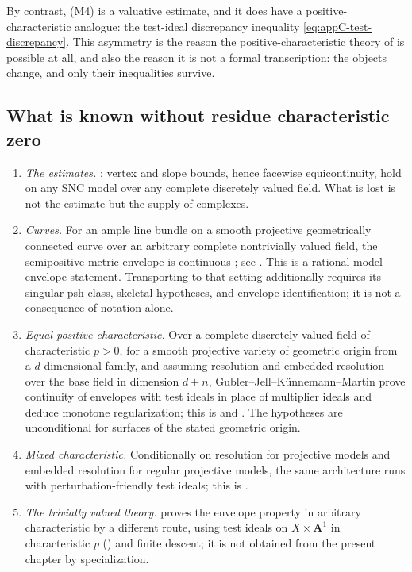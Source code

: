 By contrast, (M4) is a valuative estimate, and it does have a
positive-characteristic analogue: the test-ideal discrepancy inequality
\eqref{eq:appC-test-discrepancy}.  This asymmetry is the reason the
positive-characteristic theory of  is possible at
all, and also the reason it is not a formal transcription: the objects
change, and only their inequalities survive.

\subsection{What is known without residue characteristic zero}

\begin{enumerate}
\item \emph{The estimates.}  :
vertex and slope bounds, hence facewise equicontinuity, hold on any SNC
model over any complete discretely valued field.  What is lost is not the
estimate but the supply of complexes.
\item \emph{Curves.}  For an ample line bundle on a smooth projective
geometrically connected curve over an arbitrary complete nontrivially
valued field, the semipositive metric envelope is continuous
\cite[Theorem~1.1]{GJKM19}; see
.  This is a rational-model
envelope statement.  Transporting
 to that setting additionally
requires its singular-psh class, skeletal hypotheses, and envelope
identification; it is not a consequence of notation alone.
\item \emph{Equal positive characteristic.}  Over a complete discretely
valued field of characteristic \(p>0\), for a smooth projective variety of
geometric origin from a \(d\)-dimensional family, and assuming resolution
and embedded resolution over the base field in dimension \(d+n\),
Gubler--Jell--K\"unnemann--Martin prove continuity of envelopes with test
ideals in place of multiplier ideals and deduce monotone regularization;
this is  and \cite{GJKM19}.  The
hypotheses are unconditional for surfaces of the stated geometric origin.
\item \emph{Mixed characteristic.}  Conditionally on resolution for
projective models and embedded resolution for regular projective models,
the same architecture runs with perturbation-friendly test ideals; this is
.
\item \emph{The trivially valued theory.}   proves the
envelope property in arbitrary characteristic by a different route, using
test ideals on \(X\times\mathbf A^1\) in characteristic \(p\)
() and finite descent; it is not
obtained from the present chapter by specialization.
\end{enumerate}

